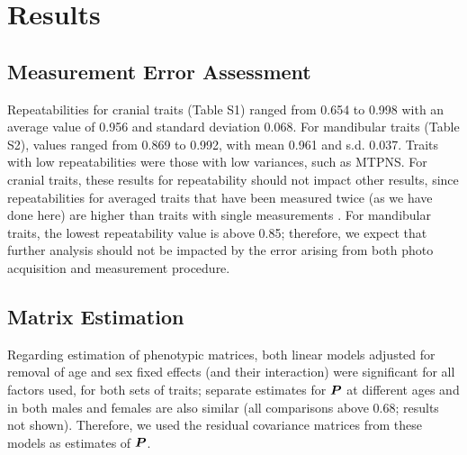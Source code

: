 \documentclass [twocolumn, natbib, nospthms, 10pt] {svjour3}
\begin{document}
\section {Results}

\subsection{Measurement Error Assessment}
\label {res:meas}

Repeatabilities for cranial traits (Table S1) ranged from
0.654 to 0.998 with an average value of 0.956 and standard deviation
0.068. For mandibular traits (Table S2), values ranged
from 0.869 to 0.992, with mean 0.961 and s.d. 0.037. Traits with low
repeatabilities were those with low variances, such as MTPNS. For
cranial traits, these results for repeatability should not impact
other results, since repeatabilities for averaged traits that have
been measured twice (as we have done here) are higher than traits with
single measurements \citep{falconer_introduction_1996}. For mandibular
traits, the lowest repeatability value is above 0.85; therefore, we
expect that further analysis should not be impacted by the error
arising from both photo acquisition and measurement procedure.

\subsection {Matrix Estimation}

Regarding estimation of phenotypic matrices, both linear models
adjusted for removal of age and sex fixed effects (and their
interaction) were significant for all factors used, for both sets of
traits; separate estimates for $\boldsymbol{P}$ at different ages and in both
males and females are also similar (all comparisons above 0.68;
results not shown). Therefore, we used the residual covariance
matrices from these models as estimates of $\boldsymbol{P}$.
\end{document}
